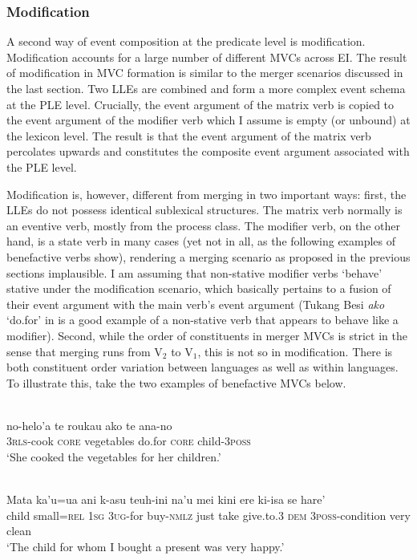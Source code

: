 \subsubsection{Modification}
\label{sec:modification}

A second way of event composition at the predicate level is modification. Modification accounts for a large number of different MVCs across EI. The result of modification in MVC formation is similar to the merger scenarios discussed in the last section. Two LLEs are combined and form a more complex event schema at the PLE level. Crucially, the event argument of the matrix verb is copied to the event argument of the modifier verb which I assume is empty (or unbound) at the lexicon level. The result is that the event argument of the matrix verb percolates upwards and constitutes the composite event argument associated with the PLE level.

Modification is, however, different from merging in two important ways: first, the LLEs do not possess identical sublexical structures. The matrix verb normally is an eventive verb, mostly from the process class. The modifier verb, on the other hand, is a state verb in many cases (yet not in all, as the following examples of benefactive verbs show), rendering a merging scenario as proposed in the previous sections implausible. I am assuming that non-stative modifier verbs `behave' stative under the modification scenario, which basically pertains to a fusion of their event argument with the main verb's event argument (Tukang Besi \textit{ako} `do.for' in  is a good example of a non-stative verb that appears to behave like a modifier). Second, while the order of constituents in merger MVCs is strict in the sense that merging runs from V$_2$ to V$_1$, this is not so in modification. There is both constituent order variation between languages as well as within languages. To illustrate this, take the two examples of benefactive MVCs below.

\ea \label{Tukang_3}
\\
\gll no-helo'a te roukau ako te ana-no \\
3\textsc{rls}-cook \textsc{core} vegetables do.for \textsc{core} child-3\textsc{poss} \\
\glft `She cooked the vegetables for her children.' \\ 
\z

\ea \label{Makalero_2}
\\
\gll Mata ka’u=ua ani k-asu teuh-ini na’u mei kini ere ki-isa se hare’ \\
child small=\textsc{rel} 1\textsc{sg} 3\textsc{ug}-for buy-\textsc{nmlz} just take give.to.3 \textsc{dem} 3\textsc{poss}-condition very clean \\
\glft `The child for whom I bought a present was very happy.' \\ 
\z

